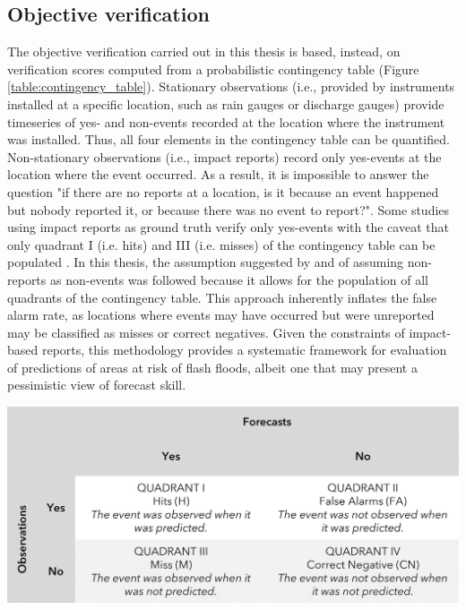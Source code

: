 \subsection{Objective verification}

The objective verification carried out in this thesis is based, instead, on verification scores computed from a probabilistic contingency table (Figure \ref{table:contingency_table}). Stationary observations (i.e., provided by instruments installed at a specific location, such as rain gauges or discharge gauges) provide timeseries of yes- and non-events recorded at the location where the instrument was installed. Thus, all four elements in the contingency table can be quantified. Non-stationary observations (i.e., impact reports) record only yes-events at the location where the event occurred. As a result, it is impossible to answer the question "if there are no reports at a location, is it because an event happened but nobody reported it, or because there was no event to report?". Some studies using impact reports as ground truth verify only yes-events with the caveat that only quadrant I (i.e. hits) and III (i.e. misses) of the contingency table can be populated \citep{Robbins_2018}. In this thesis, the assumption suggested by \citet{Tsonevsky_2018} and \citet{Pillosu_2024} of assuming non-reports as non-events was followed because it allows for the population of all quadrants of the contingency table. This approach inherently inflates the false alarm rate, as locations where events may have occurred but were unreported may be classified as misses or correct negatives. Given the constraints of impact-based reports, this methodology provides a systematic framework for evaluation of predictions of areas at risk of flash floods, albeit one that may present a pessimistic view of forecast skill.

\begin{table}[htbp]
\centering
{}
\includegraphics[width=\textwidth]{contingency_table.png}
\label{table:contingency_table}
\end{table} 

